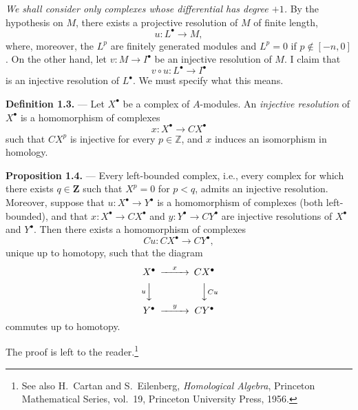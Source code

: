 \documentclass[10pt,a4paper]{article}
\newcommand{\ZZ}{\mathbf Z}
\theoremstyle{sgatheorem}
\theoremstyle{plain}
\numberwithin{equation}{section}
\begin{document}

\emph{We shall consider only complexes whose differential has degree $+1$.}
By the hypothesis on $M$, there exists a projective resolution of $M$ of
finite length,
\[
  u\colon L^\bullet\longrightarrow M,
\]
where, moreover, the $L^p$ are finitely generated modules and $L^p=0$ if
$p\notin[-n,0]$. On the other hand, let
$v\colon M\longrightarrow I^\bullet$ be an injective resolution of $M$. I
claim that
\begin{equation}
  v\circ u\colon L^\bullet\longrightarrow I^\bullet
  \tag{1.1}
\end{equation}
is an injective resolution of $L^\bullet$. We must specify what this means.

\medskip
\noindent\textbf{Definition 1.3.} --- Let $X^\bullet$ be a complex of
$A$-modules. An \emph{injective resolution} of $X^\bullet$ is a homomorphism
of complexes
\[
  x\colon X^\bullet\longrightarrow CX^\bullet
\]
such that $CX^p$ is injective for every $p\in\mathbb Z$, and $x$ induces an
isomorphism in homology.


\noindent\textbf{Proposition 1.4.} --- Every left-bounded complex, i.e., every
complex for which there exists $q\in\ZZ$ such that $X^p=0$ for $p<q$, admits
an injective resolution. Moreover, suppose that
$u\colon X^\bullet\longrightarrow Y^\bullet$ is a homomorphism of complexes
(both left-bounded), and that
$x\colon X^\bullet\longrightarrow CX^\bullet$ and
$y\colon Y^\bullet\longrightarrow CY^\bullet$ are injective resolutions of
$X^\bullet$ and $Y^\bullet$. Then there exists a homomorphism of complexes
\[
  Cu\colon CX^\bullet\longrightarrow CY^\bullet,
\]
unique up to homotopy, such that the diagram
\[
\begin{CD}
X^\bullet @>{x}>> CX^\bullet \\
@V{u}VV @VV{Cu}V \\
Y^\bullet @>{y}>> CY^\bullet
\end{CD}
\]
commutes up to homotopy.


The proof is left to the reader.\footnote{See also H.~Cartan and
S.~Eilenberg, \emph{Homological Algebra}, Princeton Mathematical Series,
vol.~19, Princeton University Press, 1956.}
\end{document}
